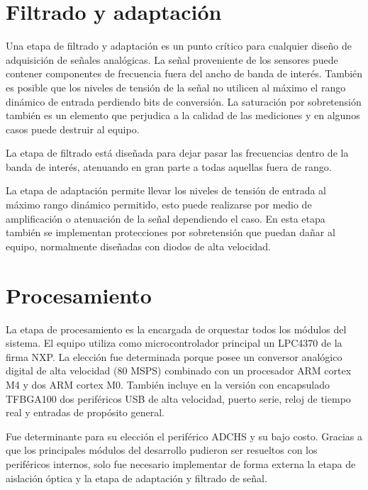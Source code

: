 \section{Filtrado y adaptación}
Una etapa de filtrado y adaptación es un punto crítico para cualquier diseño de adquisición de señales analógicas. La señal proveniente de los sensores puede contener componentes de frecuencia fuera del ancho de banda de interés. También es posible que los niveles de tensión de la señal no utilicen al máximo el rango dinámico de entrada perdiendo bits de conversión. La saturación por sobretensión también es un elemento que perjudica a la calidad de las mediciones y en algunos casos puede destruir al equipo. 

La etapa de filtrado está diseñada para dejar pasar las frecuencias dentro de la banda de interés, atenuando en gran parte a todas aquellas fuera de rango.

La etapa de adaptación permite llevar los niveles de tensión de entrada al máximo rango dinámico permitido, esto puede realizarse por medio de amplificación o atenuación de la señal dependiendo el caso. En esta etapa también se implementan protecciones por sobretensión que puedan dañar al equipo, normalmente diseñadas con diodos de alta velocidad.

\section{Procesamiento}
La etapa de procesamiento es la encargada de orquestar todos los módulos del sistema. El equipo utiliza como microcontrolador principal un LPC4370 \citep{micro:lpc4370} de la firma NXP. La elección fue determinada porque posee un conversor analógico digital de alta velocidad (80 MSPS) combinado con un procesador ARM cortex M4 y dos ARM cortex M0. También incluye en la versión con encapsulado TFBGA100 dos periféricos USB de alta velocidad, puerto serie, reloj de tiempo real y entradas de propósito general.

Fue determinante para su elección el periférico ADCHS y su bajo costo. Gracias a que los principales módulos del desarrollo pudieron ser resueltos con los periféricos internos, solo fue necesario implementar de forma externa la etapa de aislación óptica y la etapa de adaptación y filtrado de señal.

